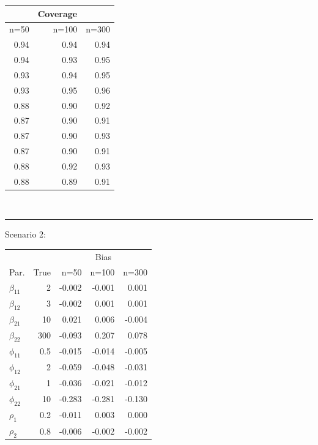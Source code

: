 \documentclass[useAMS,referee]{biom}
\begin{document}
\begin{table}[!h]
\begin{minipage}[b]{0.28\textwidth}
\begin{tabular}{rrr}
\end{tabular}
\end{minipage}
\begin{minipage}[b]{.1\textwidth}
\begin{tabular}{rrr} 
	& \multicolumn{1}{c}{Coverage}  &\\ 
	\hline
	n=50 & n=100 & n=300   \\ 	
	\hline 
	0.94&	0.94&	0.94\\
	0.94&	0.93&	0.95\\
	0.93&	0.94&	0.95\\
	0.93&	0.95&	0.96\\
	0.88&	0.90&	0.92\\
	0.87&	0.90&	0.91\\
	0.87&	0.90&	0.93\\
	0.87&	0.90&	0.91\\
	0.88&	0.92&	0.93\\
	0.88&	0.89&	0.91\\
\end{tabular}
\end{minipage}
\\\hrule\vspace{0.2cm}
Scenario 2:\\
\begin{minipage}[b]{.43\textwidth}
\begin{tabular}{lrrrr} 
	& &   \multicolumn{3}{c}{Bias}  \\ 
	\cmidrule{3-5}
	Par.	&  True & n=50 & n=100 & n=300   \\ 			\midrule 
	$\beta_{11}$ &	2&-0.002&	-0.001&	0.001\\
	$\beta_{12}$ &	3&-0.002&	0.001&	0.001\\
	$\beta_{21}$&10& 0.021&	0.006&	-0.004\\
	$\beta_{22}$&300&-0.093&	0.207&	0.078\\
	$\phi_{11}$	&0.5&-0.015&	-0.014&	-0.005\\
	$\phi_{12}$&2&	-0.059&	-0.048&	-0.031\\
	$\phi_{21}$	&1&	-0.036&	-0.021&	-0.012\\
	$\phi_{22}$	&10&-0.283&	-0.281&	-0.130\\
	$\rho_1$	&0.2&-0.011&	0.003&	0.000\\
	$\rho_2$&	0.8	&-0.006&	-0.002&	-0.002\\
\end{tabular}
\end{minipage}
\begin{minipage}[b]{.28\textwidth}
\begin{tabular}{rrr} 

\end{tabular}
\end{minipage}
\end{table}
\end{document}
